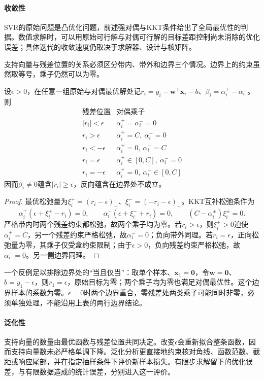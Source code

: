 \paragraph{收敛性}
SVR的原始问题是凸优化问题，前述强对偶与KKT条件给出了全局最优性的判据。数值求解时，可以用原始可行解与对偶可行解的目标差距控制尚未消除的优化误差；具体迭代的收敛速度仍取决于求解器、设计与核矩阵。

支持向量与残差位置的关系必须区分带内、带外和边界三个情况。边界上的约束虽然取等号，乘子仍然可以为零。

\begin{theorem}[SVR的样本系数与残差]
  \label{thm:regression-svr-support}
  设$\epsilon>0$，在任意一组原始与对偶最优解处记$r_i=y_i-\bm{w}^{\top}\bm{x}_i-b$、$\beta_i=\alpha_i^+-\alpha_i^-$。则
  \[
    \begin{array}{c|c}
      \text{残差位置}&\text{对偶乘子}\\ \hline
      |r_i|<\epsilon&\alpha_i^+=\alpha_i^-=0\\
      r_i>\epsilon&\alpha_i^+=C,\ \alpha_i^-=0\\
      r_i<-\epsilon&\alpha_i^+=0,\ \alpha_i^-=C\\
      r_i=\epsilon&\alpha_i^+\in[0,C],\ \alpha_i^-=0\\
      r_i=-\epsilon&\alpha_i^+=0,\ \alpha_i^-\in[0,C]
    \end{array}
  \]
  因而$\beta_i\ne0$蕴含$|r_i|\geq\epsilon$，反向蕴含在边界处不成立。
\end{theorem}

\begin{proof}
最优松弛量为$\xi_i^+=(r_i-\epsilon)_+$、$\xi_i^-=(-r_i-\epsilon)_+$。KKT互补松弛条件为
\[
  \alpha_i^+(\epsilon+\xi_i^+-r_i)=0,\qquad
  \alpha_i^-(\epsilon+\xi_i^-+r_i)=0,\qquad
  (C-\alpha_i^\pm)\xi_i^\pm=0.
\]
严格带内时两个残差约束都松弛，故两个乘子均为零。若$r_i>\epsilon$，则$\xi_i^+>0$迫使$\alpha_i^+=C$，另一个残差约束严格松弛，故$\alpha_i^-=0$；负向带外同理。若$r_i=\epsilon$，正向松弛量为零，其乘子仅受盒约束限制；由于$\epsilon>0$，负向残差约束严格松弛，故$\alpha_i^-=0$。另一侧边界同理。
\end{proof}

一个反例足以排除边界处的“当且仅当”：取单个样本、$\bm{x}_1=\bm{0}$，令$\bm{w}=\bm{0}$、$b=y_1-\epsilon$，则$r_1=\epsilon$，原始目标为零；两个乘子均为零也满足对偶最优性。这个边界样本的系数为零。$\epsilon=0$时两个边界重合，零残差处两类乘子可能同时非零，必须单独处理，不能沿用上表的两行边界结论。

\paragraph{泛化性}
支持向量的数量由最优函数与残差位置共同决定。改变$\epsilon$会重新拟合整条函数，因而支持向量数未必严格单调下降。泛化分析更直接地约束核对角线、函数范数、截距或响应尾部，并在指定抽样条件下评价新样本损失。有限步求解留下的优化误差，与有限数据造成的统计误差，分别进入这一评价。

